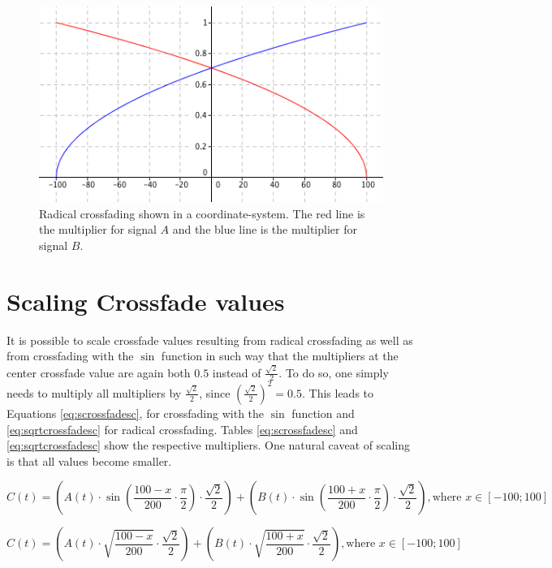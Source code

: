 \begin{figure}[h!]

  \includegraphics[scale=0.7]{img/sqrtcrossfade}

  \caption{Radical crossfading shown in a coordinate-system. The red line is the multiplier for signal $A$ and the blue line is the multiplier for signal $B$.}

  \label{fig:sqrtcrossfade}

\end{figure}

\pagebreak

\section{Scaling Crossfade values}

It is possible to scale crossfade values resulting from radical crossfading as well as from crossfading with the $\sin$ function in such way that the multipliers at the center crossfade value are again both $0.5$ instead of $\frac{\sqrt{2}}{2}$. To do so, one simply needs to multiply all multipliers by $\frac{\sqrt{2}}{2}$, since $(\frac{\sqrt{2}}{2})^2 = 0.5$. This leads to Equations \ref{eq:scrossfadesc}, for crossfading with the $\sin$ function and \ref{eq:sqrtcrossfadesc} for radical crossfading. Tables \ref{eq:scrossfadesc} and \ref{eq:sqrtcrossfadesc} show the respective multipliers. One natural caveat of scaling is that all values become smaller.

\begin{equation}
  C(t) = (A(t) \cdot \sin(\frac{100 - x}{200} \cdot \frac{\pi}{2}) \cdot \frac{\sqrt{2}}{2}) + (B(t) \cdot \sin(\frac{100 + x}{200} \cdot \frac{\pi}{2}) \cdot \frac{\sqrt{2}}{2}), \text{where } x \in [-100;100]
  \label{eq:scrossfadesc}
\end{equation}

\begin{equation}
  C(t) = (A(t) \cdot \sqrt{\frac{100 - x}{200}} \cdot \frac{\sqrt{2}}{2}) + (B(t) \cdot \sqrt{\frac{100 + x}{200}} \cdot \frac{\sqrt{2}}{2}), \text{where } x \in [-100;100]
  \label{eq:sqrtcrossfadesc}
\end{equation}

